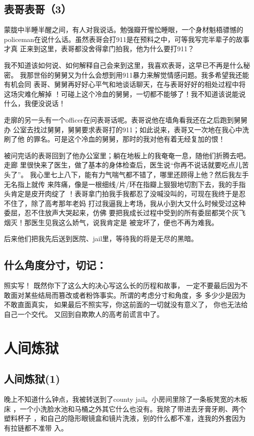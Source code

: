 \documentclass[12pt]{book}
\begin{document}
\section{表哥表哥（3）}
\label{sec-9-98}

蒙胧中半睡半醒之间，有人对我说话。勉强瓣开惺忪睡眼，一个身材魁梧骠憾的
policeman在说什么话。虽然表哥会打911是在预料之中，可等我写完半辈子的故事才真
正来到这里，表哥都没舍得拿门拍我，他为什么要打911？

我不知道该如何说、如何解释自己会来到这里，我喜欢表哥，这早已不再是什么秘密。
我那世俗的舅舅又为什么会想到用911暴力来解觉情感问题。我多希望我还能有机会同
表哥、舅舅再好好心平气和地谈话聊天，在与表哥好好的相处过程中将这场灾难化解掉
！可碰上这个冷血的舅舅，一切都不能够了！我不知道该说能说什么，我便没说话！

走廓的另一头有一个officer在问表哥话呢。表哥说他在墙角看我还在之后跑到舅舅办
公室去找过舅舅，舅舅要求表哥打的911；如此说来，表哥又一次地在我心中洗刷了他
的罪名。可是这个冷血的舅舅，那时的我对他有着无经复加的恨！

被问完话的表哥回到了他办公室里；躺在地板上的我奄奄一息，随他们折腾去吧。走廊
里很快来了医生，做了基本的身体检查后，医生说“你再不说话就要吃点儿苦头了”。
我心里七上八下，能有力气喘气都不错了，哪里还顾得上他？然后我左手无名指上就传
来阵痛，像是一根细线/片/环在指瓣上狠狠地切割下去，我的手指头肯定是皮开肉绽了
！表哥拿门拍我手我都忍了没喊没叫的，可现在我终于是忍不住了，除了高考那年老妈
打过我逼我上考场，我从小到大又什么时候受过这种委屈，忍不住放声大哭起来，仿佛
要把我成长过程中受到的所有委屈都哭个灰飞烟灭！那医生见我这么娇气，说我肯定是
被宠坏了，便也不再为难我。

后来他们把我先后送到医院、jail里，等待我的将是无尽的黑暗。
\section{什么角度分寸，切记：}
\label{sec-9-99}
照实写！
既然你下了这么大的决心写这么长的历程和故事，
一定不要最后因为不敢面对某些结局而篡改或者粉饰事实。所谓的考虑分寸和角度，多
多少少是因为不敢直面真实，
如果最后不照实写，你这前面的一切就没有意义了，
你也无法给自己一个交代。
又回到自欺欺人的高考前谎言中了。

\chapter{人间炼狱}
\label{sec-10}
\section{人间炼狱(1)}
\label{sec-10-1}
晚上不知道什么钟点，我被转送到了county jail。小房间里除了一条板凳宽的木板床
，一个小洗脸水池和马桶之外其它什么也没有。我除了带进去牙膏牙刷、两个塑料杯子
，和自己的隐形眼镜盒和镜片洗液，别的什么都不准，连我的外套因为有拉链都不准带
入。
\end{document}
